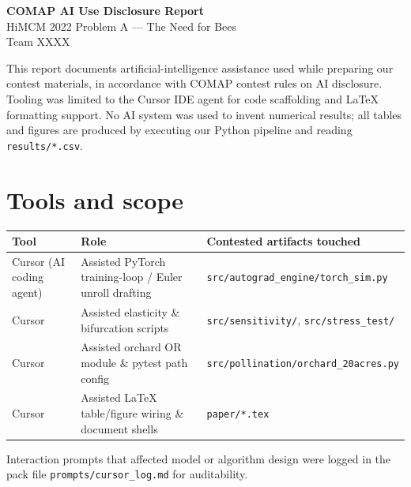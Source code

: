 \documentclass[11pt]{article}
\begin{document}
\begin{center}
{\Large\bfseries COMAP AI Use Disclosure Report}\\[0.35em]
{\large HiMCM 2022 Problem A --- The Need for Bees}\\[0.25em]
{\normalsize Team XXXX}
\end{center}

\vspace{0.8em}
\noindent
This report documents artificial-intelligence assistance used while
preparing our contest materials, in accordance with COMAP contest rules
on AI disclosure. Tooling was limited to the Cursor IDE agent for code
scaffolding and LaTeX formatting support. No AI system was used to invent
numerical results; all tables and figures are produced by executing our
Python pipeline and reading \texttt{results/*.csv}.

\section{Tools and scope}
\begin{table}[htbp]
  \centering
  \begin{tabular}{lll}
    \toprule
    Tool & Role & Contested artifacts touched \\
    \midrule
    Cursor (AI coding agent)
      & Assisted PyTorch training-loop / Euler unroll drafting
      & \texttt{src/autograd\_engine/torch\_sim.py} \\
    Cursor
      & Assisted elasticity \& bifurcation scripts
      & \texttt{src/sensitivity/}, \texttt{src/stress\_test/} \\
    Cursor
      & Assisted orchard OR module \& pytest path config
      & \texttt{src/pollination/orchard\_20acres.py} \\
    Cursor
      & Assisted LaTeX table/figure wiring \& document shells
      & \texttt{paper/*.tex} \\
    \bottomrule
  \end{tabular}
\end{table}

Interaction prompts that affected model or algorithm design were logged
in the pack file \texttt{prompts/cursor\_log.md} for auditability.
\end{document}

